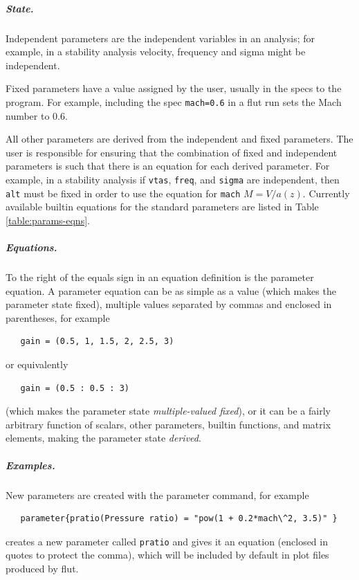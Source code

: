 \documentclass[10pt,openany,twoside]{book}
\numberwithin{equation}{section}   %
\newcommand{\Cmd}[1]{{\sf #1}}
\newcommand{\Newterm}[1]{{\em #1}}
\newcommand{\Code}[1]{{\small\tt #1}}
\newcommand{\Tableref}[1]{Table \ref{#1}}
\begin{document}
\subparagraph{State.}\label{sect:parstate}
Independent parameters are the independent variables
in an analysis; for example, in a stability analysis velocity, frequency and
sigma might be independent.
\par
Fixed parameters
have a value assigned
by the user, usually in the specs to the program. For example,
including the spec \Code{mach=0.6} in a \Cmd{flut}
run sets the Mach number to 0.6.
\par
All other parameters are derived
from the independent and fixed parameters. The user is responsible for
ensuring that the combination of fixed and independent parameters is
such that there is an equation for each derived parameter.
For example, in a stability analysis if \Code{vtas},
\Code{freq}, and \Code{sigma} are independent, then
\Code{alt} must be fixed in order to use the equation
for \Code{mach} $M = V/a(z)$.
Currently available builtin equations for the standard parameters
are listed in \Tableref{table:params-eqns}.

\subparagraph{Equations.}\label{sect:pareqns}
To the right of the equals sign in an equation definition is
the parameter equation.
A parameter equation can be as simple as a value (which makes
the parameter state fixed),
multiple values separated
by commas and enclosed in parentheses, for example
\begin{lstlisting}
   gain = (0.5, 1, 1.5, 2, 2.5, 3)
\end{lstlisting}
or equivalently
\begin{lstlisting}
   gain = (0.5 : 0.5 : 3)
\end{lstlisting}
(which makes the parameter state \Newterm{multiple-valued fixed}),
or it can be a fairly arbitrary function of scalars, other parameters,
builtin functions, and matrix elements,
making the parameter state \Newterm{derived}.
\par

\subparagraph{Examples.} \label{sect:par-examples}
New parameters are created with the
\Cmd{parameter} command, for example
\begin{lstlisting}
   parameter{pratio(Pressure ratio) = "pow(1 + 0.2*mach\^2, 3.5)" }
\end{lstlisting}
creates a new parameter called \Code{pratio} and gives it an equation
(enclosed in quotes to protect the comma), which will be included by
default in plot files produced by \Cmd{flut}.
\end{document}
